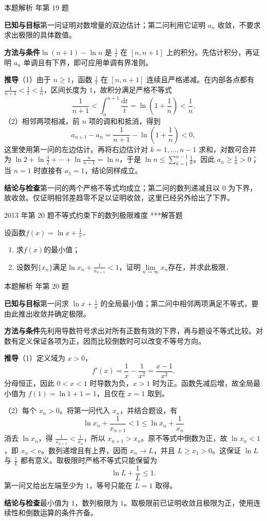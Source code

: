 \documentclass[UTF8,zihao=-4,fontset=fandol]{ctexart}
\renewcommand{\lim}{\operatorname*{lim}\limits}
\newcounter{BankQuestion}
\newcommand{\QuestionPage}[7]{%
  \stepcounter{BankQuestion}%
  \par\noindent\begin{minipage}{\linewidth}
  \raggedright
  {\small\textcolor{black!60}{#3\quad #5\quad 难度 #7}\hfill\textcolor{accent}{#2}}\par\smallskip}
\newcommand{\QuestionEnd}{\end{minipage}\par\medskip}
\newcommand{\QuestionPage}[7]{%
  \clearpage
  \stepcounter{BankQuestion}%
  {\small\textcolor{accent}{#1\hfill #2}}\par\medskip
  {\small\textcolor{black!60}{#3\quad #5\quad 难度 #7\hfill \arabic{BankQuestion} / 234}}\par\vspace{9bp}}
\newcommand{\QuestionEnd}{}
\newenvironment{QuestionSolution}[1]{%
  \clearpage
  {\small\textcolor{black!60}{本题解析\quad #1}}\par\medskip
}{\par\clearpage}
\begin{document}
\begin{QuestionSolution}{2011 年第 19 题}
\textbf{已知与目标}\quad 第一问证明对数增量的双边估计；第二问利用它证明 \(a_n\) 收敛，不要求求出极限的具体数值。

\textbf{方法与条件}\quad \(\ln(n+1)-\ln n\) 是 \(\frac{1}{t}\) 在 \([n,n+1]\) 上的积分。先估计积分，再证明 \(a_n\) 单调且有下界，即可应用单调有界准则。

\textbf{推导}\quad （1）由于 \(n\ge1\)，函数 \(\frac{1}{t}\) 在 \([n,n+1]\) 连续且严格递减。在内部各点都有 \(\frac{1}{n+1}<\frac{1}{t}<\frac{1}{n}\)，区间长度为 \(1\)，故积分满足严格不等式
\[
\frac1{n+1}<\int_n^{n+1}\frac{\mathrm{d}t}{t}
=\ln(1+\frac{1}{n})<\frac1n.
\]
（2）相邻两项相减，前 \(n\) 项的调和和抵消，得到
\[
a_{n+1}-a_n=\frac{1}{n+1}-\ln\left(1+\frac{1}{n}\right)<0,
\]
这里使用第一问的左边估计。再将右边估计对 \(k=1,\ldots,n-1\) 求和，对数可合并为 \(\ln2+\ln\frac{3}{2}+\cdots+\ln\frac{n}{n-1}=\ln n\)，于是 \(\ln n\le\sum_{k=1}^{n-1}\frac{1}{k}\)。因此 \(a_n\ge\frac{1}{n}>0\)；当 \(n=1\) 时直接有 \(a_1=1\)，结论同样成立。

\textbf{结论与检查}\quad 第一问的两个严格不等式均成立；第二问的数列递减且以 \(0\) 为下界，故收敛。仅证明相邻差趋零不足以证明收敛，这里已经另外给出了下界。
\end{QuestionSolution}

\QuestionPage{1.2 数列的极限}{解答题}{2013 年第 20 题}{3}{不等式约束下的数列极限}{010 / 234}{***}
设函数$f(x) = \ln x + \frac{1}{x}$．
\begin{enumerate}
\item
求$f(x)$的最小值；
\item
设数列$\{x_n\}$满足$\ln x_n + \frac{1}{x_{n + 1}} < 1$，证明$\lim_{n \to \infty} x_n$存在，并求此极限．
\end{enumerate}
\QuestionEnd

\begin{QuestionSolution}{2013 年第 20 题}
\textbf{已知与目标}\quad 第一问求 \(\ln x+\frac{1}{x}\) 的全局最小值；第二问中相邻两项满足不等式，要由此推出收敛并确定极限。

\textbf{方法与条件}\quad 先利用导数符号求出对所有正数有效的下界，再与题设不等式比较。对数有定义保证各项为正，因而比较倒数时可以改变不等号方向。

\textbf{推导}\quad （1）定义域为 \(x>0\)，
\[
f'(x)=\frac{1}{x}-\frac{1}{x^2}=\frac{x-1}{x^2}.
\]
分母恒正，因此 \(0<x<1\) 时导数为负，\(x>1\) 时为正。函数先减后增，故全局最小值为 \(f(1)=\ln1+1=1\)，且仅在 \(x=1\) 取到。

（2）每个 \(x_n>0\)。将第一问代入 \(x_n\)，并结合题设，有
\[
\ln x_n+\frac1{x_{n+1}}<1\le\ln x_n+\frac1{x_n}
\]
消去 \(\ln x_n\)，得 \(\frac{1}{x_{n+1}}<\frac{1}{x_n}\)，所以 \(x_{n+1}>x_n\)。原不等式中倒数为正，故 \(\ln x_n<1\)，即 \(x_n<\mathrm e\)。数列递增且有上界，因而 \(x_n\to L\)，并且 \(L\ge x_1>0\)。这保证 \(\ln L\) 与 \(\frac{1}{L}\) 都有意义。取极限时严格不等式只能保留为
\[
\ln L+\frac{1}{L}\le1.
\]
第一问又给出左端至少为 \(1\)，等号只能在 \(L=1\) 取得。

\textbf{结论与检查}\quad 最小值为 \(\boxed{1}\)，数列极限为 \(\boxed{1}\)。取极限前已证明收敛且极限为正，使用连续性和倒数运算的条件齐备。
\end{QuestionSolution}
\end{document}
